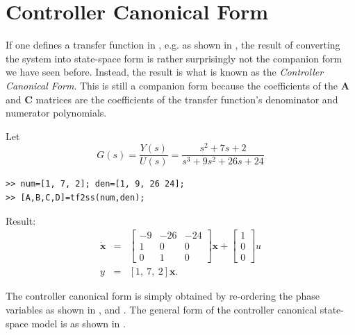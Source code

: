\def\FileDate{98/11/03}
\def\FileVersion{1.0}

\section*{Controller Canonical Form}
If one defines a transfer function in \Matlab{}, e.g. as shown in
, the result of converting the system into
state-space form is rather surprisingly not the companion form we
have seen before. Instead, the result is what is known as the
\emph{Controller Canonical Form}. This is still a companion form
because the coefficients of the $\mathbf{A}$ and $\mathbf{C}$
matrices are the coefficients of the transfer function's
denominator and numerator polynomials.
\begin{slide}\label{slide:l5s5}
Let \[ G(s)
=\frac{Y(s)}{U(s)} = \frac{s^2 + 7s + 2 }{s^3 + 9s^2 + 26s + 24}\]
\begin{verbatim}
>> num=[1, 7, 2]; den=[1, 9, 26 24];
>> [A,B,C,D]=tf2ss(num,den);
\end{verbatim}
Result:
\begin{eqnarray*}
\dot{\mathbf{x}} & = &\left[\begin{array}{ccc}
  -9 & -26 & -24  \\
  1 & 0 & 0  \\
  0 & 1  & 0
 \end{array}\right]\mathbf{x}+\left[\begin{array}{c}
  1 \\
  0 \\
  0
\end{array}\right]u\\
y & = & [1,\ 7,\ 2] \mathbf{x}.\end{eqnarray*}
\end{slide}
The controller canonical form is simply obtained by re-ordering
the phase variables as shown in ,
 and . The general form of the
controller canonical state-space model is as shown in
.
